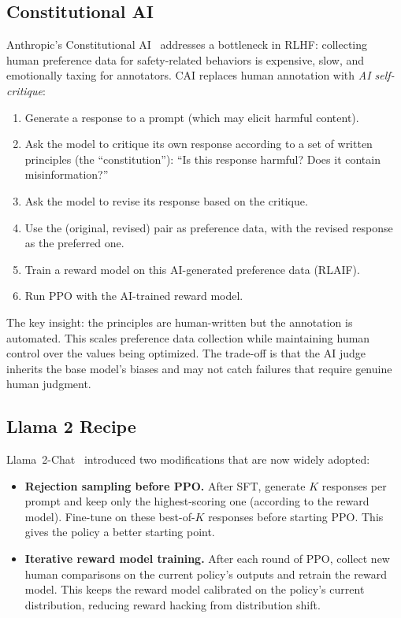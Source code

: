 \subsection{Constitutional AI}

Anthropic's Constitutional AI~\cite{bai2022constitutional} addresses a bottleneck in RLHF: collecting human preference data for safety-related behaviors is expensive, slow, and emotionally taxing for annotators. CAI replaces human annotation with \emph{AI self-critique}:

\begin{enumerate}[nosep]
  \item Generate a response to a prompt (which may elicit harmful content).
  \item Ask the model to critique its own response according to a set of written principles (the ``constitution''): ``Is this response harmful? Does it contain misinformation?''
  \item Ask the model to revise its response based on the critique.
  \item Use the (original, revised) pair as preference data, with the revised response as the preferred one.
  \item Train a reward model on this AI-generated preference data (RLAIF).
  \item Run PPO with the AI-trained reward model.
\end{enumerate}

The key insight: the principles are human-written but the annotation is automated. This scales preference data collection while maintaining human control over the values being optimized. The trade-off is that the AI judge inherits the base model's biases and may not catch failures that require genuine human judgment.

\subsection{Llama 2 Recipe}

Llama~2-Chat~\cite{touvron2023llama2} introduced two modifications that are now widely adopted:

\begin{itemize}[nosep]
  \item \textbf{Rejection sampling before PPO.} After SFT, generate $K$ responses per prompt and keep only the highest-scoring one (according to the reward model). Fine-tune on these best-of-$K$ responses before starting PPO. This gives the policy a better starting point.
  \item \textbf{Iterative reward model training.} After each round of PPO, collect new human comparisons on the current policy's outputs and retrain the reward model. This keeps the reward model calibrated on the policy's current distribution, reducing reward hacking from distribution shift.
\end{itemize}


